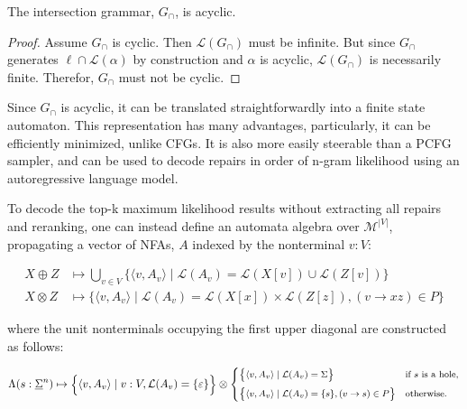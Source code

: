 \documentclass[sigplan,review,acmsmall,nonacm,anonymous]{acmart}\settopmatter{printfolios=false,printccs=false,printacmref=false}
\begin{document}
  \begin{lemma}\label{lemma:upper-bound}
    The intersection grammar, $G_\cap$, is acyclic.
  \end{lemma}

  \begin{proof}
    Assume $G_\cap$ is cyclic. Then $\mathcal{L}(G_\cap)$ must be infinite. But since $G_\cap$ generates $\ell \cap \mathcal{L}(\alpha)$ by construction and $\alpha$ is acyclic, $\mathcal{L}(G_\cap)$ is necessarily finite. Therefor, $G_\cap$ must not be cyclic.
  \end{proof}

  Since $G_\cap$ is acyclic, it can be translated straightforwardly into a finite state automaton. This representation has many advantages, particularly, it can be efficiently minimized, unlike CFGs. It is also more easily steerable than a PCFG sampler, and can be used to decode repairs in order of n-gram likelihood using an autoregressive language model.

  To decode the top-k maximum likelihood results without extracting all repairs and reranking, one can instead define an automata algebra over $\mathcal{M}^{|V|}$, propagating a vector of NFAs, $A$ indexed by the nonterminal $v: V$:

  \begin{align}
    X \oplus Z &\mapsto \bigcup_{v \in V}\big\{\langle v, A_v \rangle \mid \mathcal{L}(A_v) = \mathcal{L}(X[v]) \cup \mathcal{L}(Z[v])\big\}\\
    X \otimes Z &\mapsto \big\{\langle v, A_v \rangle \mid \mathcal{L}(A_v) = \mathcal{L}(X[x]) \times \mathcal{L}(Z[z]), (v \rightarrow xz) \in P\big\}
  \end{align}

  \noindent where the unit nonterminals occupying the first upper diagonal are constructed as follows:

  \begin{equation}
    \begin{footnotesize}
      \Lambda(s: \underline\Sigma^n) \mapsto \Big\{\langle v, A_v\rangle\mid v: V, \mathcal{L}(A_v) = \{\varepsilon\}\Big\} \otimes \begin{cases}
        \big\{\langle v, A_v \rangle \mid \mathcal{L}(A_v) = \Sigma \big\} & \text{if $s$ is a hole,} \vspace{5pt}\\
        \big\{\langle v, A_v \rangle \mid \mathcal{L}(A_v) = \{s\}, (v \rightarrow s)\in P\big\} & \text{otherwise.}
      \end{cases}
    \end{footnotesize}
  \end{equation}
\end{document}

